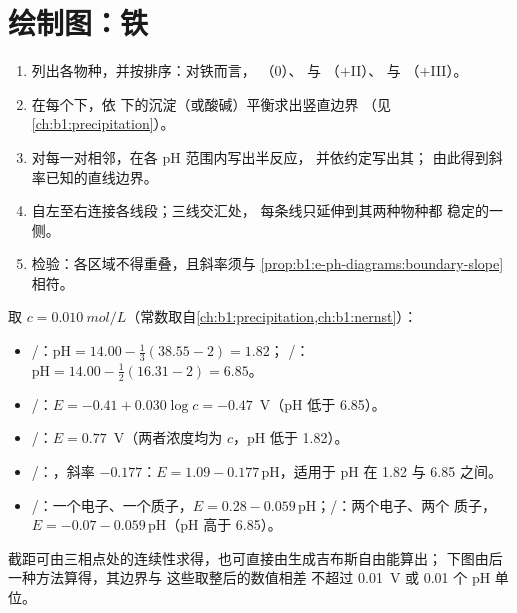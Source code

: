 \section{绘制图：铁}

\begin{method}[绘制电势--pH 图]\label{met:b1:e-ph-diagrams:build}
\begin{enumerate}
  \item 列出各物种，并按排序：对铁而言，
        （0）、 与 （$+$II）、 与
        （$+$III）。
  \item 在每个下，依
        下的沉淀（或酸碱）平衡求出竖直边界
        （见\cref{ch:b1:precipitation}）。
  \item 对每一对相邻，在各 pH 范围内写出半反应，
        并依约定写出其；
        由此得到斜率已知的直线边界。
  \item 自左至右连接各线段；三线交汇处，
        每条线只延伸到其两种物种都
        稳定的一侧。
  \item 检验：各区域不得重叠，且斜率须与
        \cref{prop:b1:e-ph-diagrams:boundary-slope}相符。
\end{enumerate}
\end{method}

\begin{example}[铁的边界]\label{ex:b1:e-ph-diagrams:iron}
取 $c = \qty{0.010}{mol/L}$（常数取自\cref{ch:b1:precipitation,ch:b1:nernst}）：
\begin{itemize}
  \item {}/：$\mathrm{pH} = 14.00 - \frac13(38.55 - 2) = 1.82$；
        /：$\mathrm{pH} = 14.00 - \frac12(16.31 - 2) = 6.85$。
  \item {}/：$E = -0.41 + 0.030\log c = -0.47$~V（pH 低于 6.85）。
  \item {}/：$E = 0.77$~V（两者浓度均为 $c$，pH 低于 1.82）。
  \item {}/：，斜率
        $-0.177$：$E = 1.09 - 0.177\,\mathrm{pH}$，适用于 pH 在 1.82 与 6.85 之间。
  \item {}/：一个电子、一个质子，$E = 0.28 -
        0.059\,\mathrm{pH}$；/：两个电子、两个
        质子，$E = -0.07 - 0.059\,\mathrm{pH}$（pH 高于 6.85）。
\end{itemize}
截距可由三相点处的连续性求得，也可直接由生成吉布斯自由能算出；
下图由后一种方法算得，其边界与
这些取整后的数值相差
不超过 \qty{0.01}{V} 或 0.01 个 pH 单位。
\end{example}

